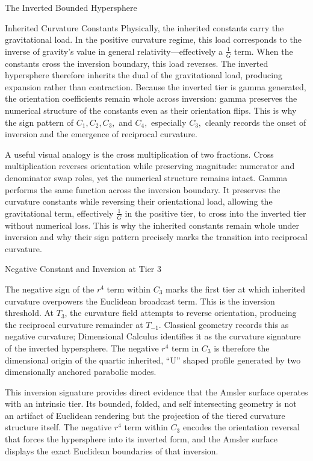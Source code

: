 \documentclass[final,onefignum,onetabnum]{siamart}
\begin{document}
\begin{section}{The Inverted Bounded Hypersphere}
\begin{subsection}{Inherited Curvature Constants}
Physically, the inherited constants carry the gravitational load. In the positive curvature regime, this load corresponds to the inverse of gravity’s value in general relativity—effectively a $\frac{1}{G}$ term. When the constants cross the inversion boundary, this load reverses. The inverted hypersphere therefore inherits the dual of the gravitational load, producing expansion rather than contraction. Because the inverted tier is gamma generated, the orientation coefficients remain whole across inversion: gamma preserves the numerical structure of the constants even as their orientation flips. This is why the sign pattern of $C_1, C_2, C_3,$ and $C_4,$ especially $C_3,$ cleanly records the onset of inversion and the emergence of reciprocal curvature.

A useful visual analogy is the cross multiplication of two fractions. Cross multiplication reverses orientation while preserving magnitude: numerator and denominator swap roles, yet the numerical structure remains intact. Gamma performs the same function across the inversion boundary. It preserves the curvature constants while reversing their orientational load, allowing the gravitational term, effectively $\frac{1}{G}$ in the positive tier, to cross into the inverted tier without numerical loss. This is why the inherited constants remain whole under inversion and why their sign pattern precisely marks the transition into reciprocal curvature.
\end{subsection}

\begin{subsection}{Negative Constant and Inversion at Tier 3}

The negative sign of the $r^4$ term within $C_3$ marks the first tier at which inherited curvature overpowers the Euclidean broadcast term. This is the inversion threshold. At $T_3$, the curvature field attempts to reverse orientation, producing the reciprocal curvature remainder at $T_{-1}$. Classical geometry records this as negative curvature; Dimensional Calculus identifies it as the curvature signature of the inverted hypersphere. The negative $r^4$ term in $C_3$ is therefore the dimensional origin of the quartic inherited, ``U'' shaped profile generated by two dimensionally anchored parabolic modes.

This inversion signature provides direct evidence that the Amsler surface operates with an intrinsic tier. Its bounded, folded, and self intersecting geometry is not an artifact of Euclidean rendering but the projection of the tiered curvature structure itself. The negative $r^4$ term within $C_3$ encodes the orientation reversal that forces the hypersphere into its inverted form, and the Amsler surface displays the exact Euclidean boundaries of that inversion.
\end{subsection}


\end{section}
\end{document}
